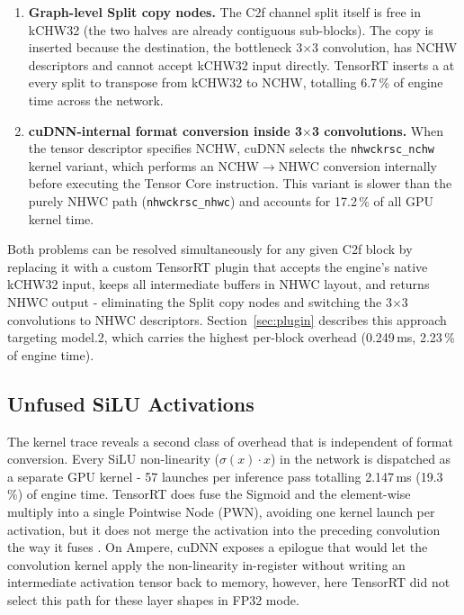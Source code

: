 \documentclass[12pt,a4paper]{report}
\begin{document}
\begin{enumerate}
\item \textbf{Graph-level Split copy nodes.}
The C2f channel split itself is free in kCHW32 (the two halves are already contiguous sub-blocks).
The copy is inserted because the destination, the bottleneck 3$\times$3 convolution, has
NCHW descriptors and cannot accept kCHW32 input directly.
TensorRT inserts a  at every split to transpose from kCHW32 to NCHW,
totalling 6.7\,\% of engine time across the network.

\item \textbf{cuDNN-internal format conversion inside 3$\times$3 convolutions.}
When the tensor descriptor specifies NCHW, cuDNN selects the \texttt{nhwckrsc\_nchw} kernel variant,
which performs an NCHW$\rightarrow$NHWC conversion internally before executing the Tensor Core
instruction.
This variant is slower than the purely NHWC path (\texttt{nhwckrsc\_nhwc}) and accounts for 17.2\,\%
of all GPU kernel time.
\end{enumerate}

Both problems can be resolved simultaneously for any given C2f block by replacing it with a custom
TensorRT plugin that accepts the engine's native kCHW32 input, keeps all intermediate buffers in NHWC
layout, and returns NHWC output - eliminating the Split copy nodes and switching the 3$\times$3
convolutions to NHWC descriptors.
Section~\ref{sec:plugin} describes this approach targeting model.2, which carries the highest
per-block overhead (0.249\,ms, 2.23\,\% of engine time).

\subsection{Unfused SiLU Activations}

The kernel trace reveals a second class of overhead that is independent of format conversion.
Every SiLU non-linearity ($\sigma(x)\cdot x$) in the network is dispatched as a separate
 GPU kernel - 57 launches per inference pass totalling
2.147\,ms (19.3\,\%) of engine time.
TensorRT does fuse the Sigmoid and the element-wise multiply into a single Pointwise Node (PWN),
avoiding one kernel launch per activation, but it does not merge the activation
into the preceding convolution the way it fuses .
On Ampere, cuDNN exposes a  epilogue that would let the
convolution kernel apply the non-linearity in-register without writing an intermediate activation
tensor back to memory, however, here TensorRT did not select this path for these layer shapes
in FP32 mode.
\end{document}
